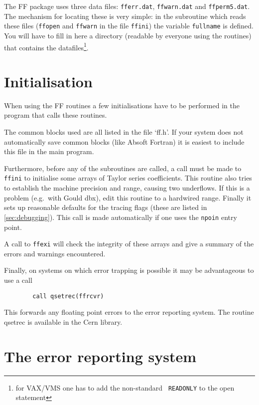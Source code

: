 The FF package uses three data files: {\tt fferr.dat}, {\tt ffwarn.dat} and 
{\tt ffperm5.dat}.  The mechanism for locating these is very simple: in the 
subroutine which reads these files ({\tt ffopen} and {\tt ffwarn} in the file 
{\tt ffini}) the variable {\tt fullname} is defined.  You will have to fill 
in here a directory (readable by everyone using the routines) that contains 
the datafiles\footnote{for VAX/VMS one has to add the non-standard {\tt 
READONLY} to the open statement}.

\section{Initialisation}
\label{sc:initialisation}

When using the FF routines a few initialisations have to be performed in the 
program that calls these routines.

The common blocks used are all listed in the file `ff.h'.  If your system does 
not automatically save common blocks (like Absoft Fortran) it is easiest to 
include this file in the main program.

Furthermore, before any of the subroutines are called, a call must be made to 
{\tt ffini} to initialise some arrays of Taylor series coefficients.  This 
routine also tries to establish the machine precision and range, causing two 
underflows.  If this is a problem (e.g.~with Gould dbx), edit this routine to 
a hardwired range.  Finally it sets up reasonable defaults for the tracing 
flags (these are listed in \ref{sec:debugging}).  This call is made 
automatically if one uses the {\tt npoin} entry point.

A call to {\tt ffexi} will check the integrity of these arrays and give a 
summary of the errors and warnings encountered.

Finally, on systems on which error trapping is possible it may be advantageous 
to use a call
\begin{verbatim}
        call qsetrec(ffrcvr)
\end{verbatim}
This forwards any floating point errors to the error reporting system.  The 
routine qsetrec is available in the Cern library.

\section{The error reporting system}

